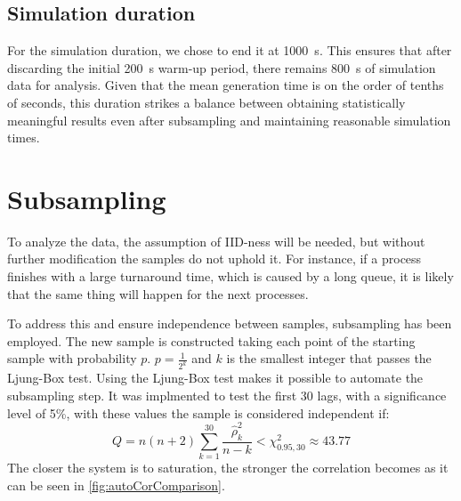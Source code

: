 \subsection{Simulation duration}

For the simulation duration, we chose to end it at \SI{1000}{\second}. This ensures that after discarding the initial \SI{200}{\second} warm-up period, there remains \SI{800}{\second} of simulation data for analysis. Given that the mean generation time is on the order of tenths of seconds, this duration strikes a balance between obtaining statistically meaningful results even after subsampling and maintaining reasonable simulation times.


\section{Subsampling}

To analyze the data, the assumption of IID-ness will be needed, but without further modification the samples do not uphold it.
For instance, if a process finishes with a large turnaround time, which is caused by a long queue, it is likely that the same thing will happen for the next processes.

To address this and ensure independence between samples, subsampling has been employed. The new sample is constructed taking each point of the starting sample with probability $p$.
$p = \frac{1}{2^k}$ and $k$ is the smallest integer that passes the Ljung-Box test.
Using the Ljung-Box test makes it possible to automate the subsampling step. It was implmented to test the first 30 lags, with a significance level of 5\%, with these values the sample is considered independent if:
\vspace{-0.5\baselineskip}
\begin{equation}
    Q = n(n+2) \sum_{k=1}^{30} \frac{\hat{\rho}_k^2}{n-k} < \chi^2_{0.95,30} \approx 43.77
\end{equation}
The closer the system is to saturation, the stronger the correlation becomes as it can be seen in \cref{fig:autoCorComparison}.

